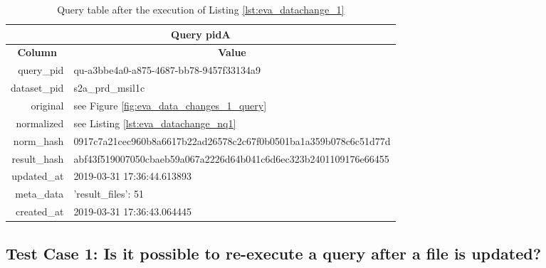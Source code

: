 \documentclass[draft,final]{vutinfth} %
\begin{document}
\begin{enumerate}
	\begin{table}[]
		\caption{Query table after the execution of Listing \ref{lst:eva_datachange_1}}
		\centering
		\begin{tabular}{|r|l|}
			\hline \multicolumn{2}{|c|}{\textbf{Query pidA}} \\
			\hline \multicolumn{1}{|c|}{\textbf{Column}}  &  \multicolumn{1}{c|}{\textbf{Value}} \\ \hline
			query\_pid & qu-a3bbe4a0-a875-4687-bb78-9457f33134a9  \\ 
			dataset\_pid & s2a\_prd\_msil1c  \\ 
			original & see Figure \ref{fig:eva_data_changes_1_query}   \\
			normalized & see Listing \ref{lst:eva_datachange_nq1}  \\
			norm\_hash & 0917c7a21cec960b8a6617b22ad26578c2c67f0b0501ba1a359b078c6c51d77d  \\
			result\_hash & abf43f519007050cbaeb59a067a2226d64b041c6d6ec323b2401109176e66455   \\
			updated\_at & 2019-03-31 17:36:44.613893   \\
			meta\_data & {'result\_files': 51}  \\
			created\_at & 2019-03-31 17:36:43.064445   \\ \hline
		\end{tabular}
		\label{Tab:eva_datachanges1}
	\end{table}
\end{enumerate}

\subsection{Test Case 1: Is it possible to re-execute a query after a file is updated?}	\label{Tab:eva_datachanges_tc1}
\end{document}
